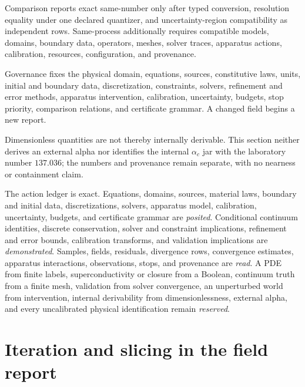 Comparison reports exact same-number only after typed conversion, resolution equality under one declared quantizer,
and uncertainty-region compatibility as independent rows.  Same-process additionally requires compatible models,
domains, boundary data, operators, meshes, solver traces, apparatus actions, calibration, resources, configuration,
and provenance.

Governance fixes the physical domain, equations, sources, constitutive laws, units, initial and boundary data,
discretization, constraints, solvers, refinement and error methods, apparatus intervention, calibration, uncertainty,
budgets, stop priority, comparison relations, and certificate grammar.  A changed field begins a new report.

Dimensionless quantities are not thereby internally derivable.  This section neither derives an external alpha nor
identifies the internal \(\alpha_c\) jar with the laboratory number \(137.036\); the numbers and provenance remain
separate, with no nearness or containment claim.

The action ledger is exact.  Equations, domains, sources, material laws, boundary and initial data, discretizations,
solvers, apparatus model, calibration, uncertainty, budgets, and certificate grammar are \emph{posited}.  Conditional
continuum identities, discrete conservation, solver and constraint implications, refinement and error bounds,
calibration transforms, and validation implications are \emph{demonstrated}.  Samples, fields, residuals, divergence
rows, convergence estimates, apparatus interactions, observations, stops, and provenance are \emph{read}.  A PDE from
finite labels, superconductivity or closure from a Boolean, continuum truth from a finite mesh, validation from solver
convergence, an unperturbed world from intervention, internal derivability from dimensionlessness, external alpha,
and every uncalibrated physical identification remain \emph{reserved}.
\section{Iteration and slicing in the field report}

